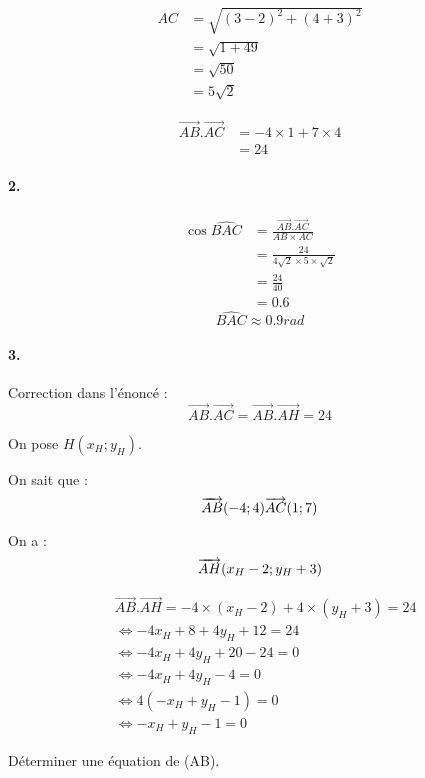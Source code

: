 \documentclass[12pt]{article}
\begin{document}
\begin{align*}
AC &= \sqrt{(3 - 2)^2 + (4 + 3)^2}\\
&= \sqrt{1 + 49}\\
&= \sqrt{50}\\
&= 5\sqrt{2}
\end{align*}

\begin{align*}
\overrightarrow{AB}.\overrightarrow{AC} &= -4 \times 1 + 7 \times 4\\
&= 24
\end{align*}

\paragraph{2.}
\begin{align*}
\cos \widehat{BAC} &= \frac{\overrightarrow{AB}.\overrightarrow{AC}}{AB \times AC}\\
&= \frac{24}{4\sqrt{2} \times 5 \times \sqrt{2}}\\
&= \frac{24}{40}\\
&= 0.6
\end{align*}
\[
\widehat{BAC} \approx 0.9 rad
\]

\paragraph{3.}
Correction dans l'énoncé :
\[
\overrightarrow{AB}.\overrightarrow{AC} = \overrightarrow{AB}.\overrightarrow{AH} = 24
\]

On pose $H(x_H;y_H)$.

On sait que :
\[
\overrightarrow{AB}(-4;4)\\
\overrightarrow{AC}(1;7)
\]

On a :
\[
\overrightarrow{AH}(x_H - 2;y_H +3)\\
\]

\begin{align*}
&\overrightarrow{AB}.\overrightarrow{AH} = -4 \times (x_H - 2) + 4 \times (y_H + 3) = 24\\
&\Leftrightarrow -4x_H + 8 + 4y_H + 12 = 24\\
&\Leftrightarrow -4x_H + 4y_H + 20 - 24 = 0\\
&\Leftrightarrow -4x_H + 4y_H - 4 = 0\\
&\Leftrightarrow 4(-x_H + y_H - 1) = 0\\
&\Leftrightarrow -x_H + y_H - 1 = 0
\end{align*}

Déterminer une équation de (AB).
\end{document}
